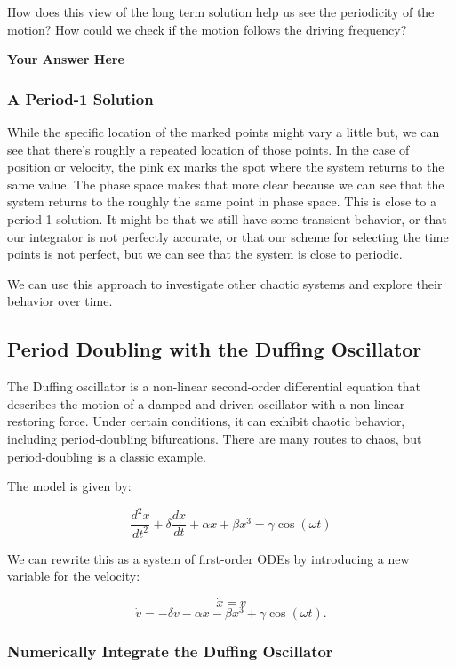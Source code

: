 \documentclass[11pt]{article}
\begin{document}
    How does this view of the long term solution help us see the periodicity
of the motion? How could we check if the motion follows the driving
frequency?

\textbf{Your Answer Here}

    \subsubsection{A Period-1 Solution}\label{a-period-1-solution}

While the specific location of the marked points might vary a little
but, we can see that there's roughly a repeated location of those
points. In the case of position or velocity, the pink ex marks the spot
where the system returns to the same value. The phase space makes that
more clear because we can see that the system returns to the roughly the
same point in phase space. This is close to a period-1 solution. It
might be that we still have some transient behavior, or that our
integrator is not perfectly accurate, or that our scheme for selecting
the time points is not perfect, but we can see that the system is close
to periodic.

We can use this approach to investigate other chaotic systems and
explore their behavior over time.

    \subsection{Period Doubling with the Duffing
Oscillator}\label{period-doubling-with-the-duffing-oscillator}

The Duffing oscillator is a non-linear second-order differential
equation that describes the motion of a damped and driven oscillator
with a non-linear restoring force. Under certain conditions, it can
exhibit chaotic behavior, including period-doubling bifurcations. There
are many routes to chaos, but period-doubling is a classic example.

The model is given by:

\[\frac{d^2x}{dt^2} + \delta \frac{dx}{dt} + \alpha x + \beta x^3 = \gamma \cos(\omega t)\]

We can rewrite this as a system of first-order ODEs by introducing a new
variable for the velocity:

\[\dot{x} = v\]
\[\dot{v} = -\delta v - \alpha x - \beta x^3 + \gamma \cos(\omega t).\]

\subsubsection{Numerically Integrate the Duffing
Oscillator}\label{numerically-integrate-the-duffing-oscillator}
\end{document}
